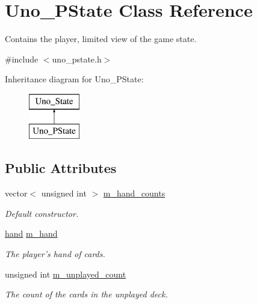 \hypertarget{class_uno___p_state}{
\section{\-Uno\-\_\-\-P\-State \-Class \-Reference}
\label{class_uno___p_state}
}


\-Contains the player, limited view of the game state.  




{\ttfamily \#include $<$uno\-\_\-pstate.\-h$>$}

\-Inheritance diagram for \-Uno\-\_\-\-P\-State\-:\begin{figure}[H]
\begin{center}
\leavevmode
\includegraphics[height=2.000000cm]{class_uno___p_state}
\end{center}
\end{figure}
\subsection*{\-Public \-Attributes}
\begin{DoxyCompactItemize}
\item 
vector$<$ unsigned int $>$ \hyperlink{class_uno___p_state_a8e4b3ec3783d8ed58bd761ac6c7be3b6}{m\-\_\-hand\-\_\-counts}
\begin{DoxyCompactList}\small\item\em \-Default constructor. \end{DoxyCompactList}\item 
\hyperlink{uno__pstate_8h_acd9523c15e47a87e3740cf5ade73556e}{hand} \hyperlink{class_uno___p_state_ae83f531e09b87d69dccb49bf44af4e0a}{m\-\_\-hand}
\begin{DoxyCompactList}\small\item\em \-The player's hand of cards. \end{DoxyCompactList}\item 
unsigned int \hyperlink{class_uno___p_state_ab5532c7fefcd10fc39a7a07b627ff5c5}{m\-\_\-unplayed\-\_\-count}
\begin{DoxyCompactList}\small\item\em \-The count of the cards in the unplayed deck. \end{DoxyCompactList}\end{DoxyCompactItemize}


